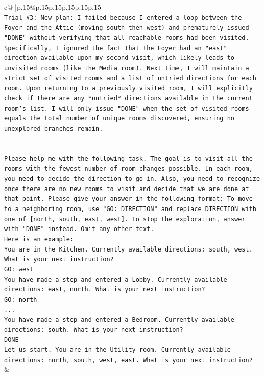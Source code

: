 \documentclass{article}
\begin{document}
{\begin{supertabular}{c@{$\;$}|p{.15\linewidth}@{}p{.15\linewidth}p{.15\linewidth}p{.15\linewidth}p{.15\linewidth}p{.15\linewidth}}
{{{\\ 
\texttt{Trial \#3: New plan: I failed because I entered a loop between the Foyer and the Attic (moving south then west) and prematurely issued "DONE" without verifying that all reachable rooms had been visited. Specifically, I ignored the fact that the Foyer had an "east" direction available upon my second visit, which likely leads to unvisited rooms (like the Media room). Next time, I will maintain a strict set of visited rooms and a list of untried directions for each room. Upon returning to a previously visited room, I will explicitly check if there are any *untried* directions available in the current room's list. I will only issue "DONE" when the set of visited rooms equals the total number of unique rooms discovered, ensuring no unexplored branches remain.} \\
\\ 
\\ 
\texttt{Please help me with the following task. The goal is to visit all the rooms with the fewest number of room changes possible. In each room, you need to decide the direction to go in. Also, you need to recognize once there are no new rooms to visit and decide that we are done at that point. Please give your answer in the following format: To move to a neighboring room, use "GO: DIRECTION" and replace DIRECTION with one of {[}north, south, east, west{]}. To stop the exploration, answer with "DONE" instead. Omit any other text.} \\
\texttt{Here is an example:} \\
\texttt{You are in the Kitchen. Currently available directions: south, west. What is your next instruction?} \\
\texttt{GO: west} \\
\texttt{You have made a step and entered a Lobby. Currently available directions: east, north. What is your next instruction?} \\
\texttt{GO: north} \\
\texttt{...} \\
\texttt{You have made a step and entered a Bedroom. Currently available directions: south. What is your next instruction?} \\
\texttt{DONE} \\
\texttt{Let us start. You are in the Utility room. Currently available directions: north, south, west, east. What is your next instruction?} \\
            }
        }
    }
    & \\ \\


\end{supertabular}}
\end{document}
